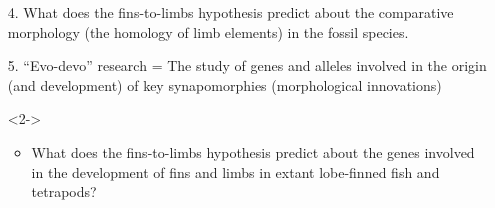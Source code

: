 \begin{frame}[t]
    \begin{adjustwidth}{-2em}{-1.5em}

        \begin{itemize}
            \item[4.] What does the fins-to-limbs hypothesis predict about the
                comparative morphology (the homology of limb elements) in the
                fossil species.


            \item[5.] ``Evo-devo'' research = The study of genes and alleles
                involved in the origin (and development) of key synapomorphies
                (morphological innovations)

            \begin{uncoverenv}<2->
            \begin{itemize}

                \item What does the fins-to-limbs hypothesis predict about the
                    genes involved in the development of fins and limbs in
                    extant lobe-finned fish and tetrapods?


            \end{itemize}
            \end{uncoverenv}

        \end{itemize}

    \end{adjustwidth}
\end{frame}

